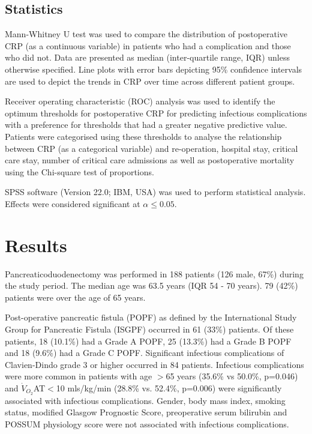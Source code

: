 \subsection{Statistics}
Mann-Whitney U test was used to compare the distribution of postoperative CRP (as a continuous variable) in patients who had a complication and those who did not. Data are presented as median (inter-quartile range, IQR) unless otherwise specified. Line plots with error bars depicting 95\% confidence intervals are used to depict the trends in CRP over time across different patient groups. 

Receiver operating characteristic (ROC) analysis was used to identify the optimum thresholds for postoperative CRP for predicting infectious complications with a preference for thresholds that had a greater negative predictive value. Patients were categorised using these thresholds to analyse the relationship between CRP (as a categorical variable) and re-operation, hospital stay, critical care stay, number of critical care admissions as well as postoperative mortality using the Chi-square test of proportions. 

SPSS software (Version 22.0; IBM, USA) was used to perform statistical analysis.
Effects were considered significant at $\alpha \leq0.05$. 



\section{Results}
Pancreaticoduodenectomy was performed in 188 patients (126 male, 67\%) during the study period. The median age was 63.5 years (IQR 54 - 70 years). 79 (42\%) patients were over the age of 65 years. 

Post-operative pancreatic fistula (POPF) as defined by the International Study Group for Pancreatic Fistula (ISGPF) occurred in 61 (33\%) patients. Of these patients, 18 (10.1\%) had a Grade A POPF, 25 (13.3\%) had a Grade B POPF and 18 (9.6\%) had a Grade C POPF. Significant infectious complications of Clavien-Dindo grade 3 or higher occurred in 84 patients. Infectious complications were more common in patients with age $>$65 years (35.6\% vs 50.0\%, p=0.046) and $\dot{V}_{O_2}$AT$<$10 mls/kg/min (28.8\% vs. 52.4\%, p=0.006) were significantly associated with infectious complications. Gender, body mass index, smoking status, modified Glasgow Prognostic Score, preoperative serum bilirubin and POSSUM physiology score were not associated with infectious complications.

